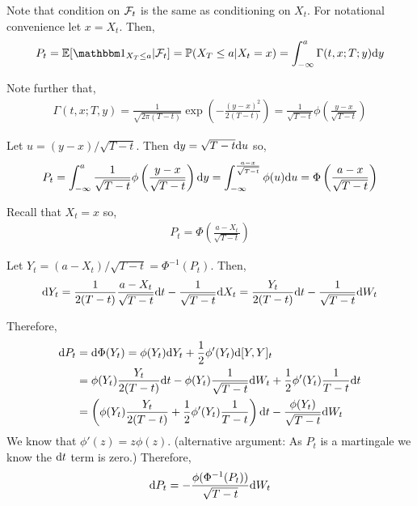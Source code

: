 \begin{solution}[Solution]
Note that condition on \( \mathcal{F}_t \) is the same as conditioning on \( X_t \). For notational convenience let \( x=X_t \). Then,
\begin{align*}
    P_t = \EE[\bOne_{X_T\leq a} | \cF_t] = \PP(X_T\leq a | X_t = x)
    = \int_{-\infty}^a \Gamma(t,x;T;y)\d y
\end{align*}

Note further that,
\begin{align*}
    \Gamma(t,x;T,y) = \frac{1}{\sqrt{2\pi (T-t)}}\exp \left( -\frac{(y-x)^2}{2(T-t)} \right) 
    = \frac{1}{\sqrt{T-t}}\phi \left( \frac{y-x}{\sqrt{T-t}} \right)
\end{align*}

    Let \( u = (y-x)/\sqrt{T-t} \). Then \( \mathrm{d} y = \sqrt{T-t} \mathrm{d} u \) so,
    \begin{align*}
       P_t
        = \int_{-\infty}^{a}  \frac{1}{\sqrt{T-t}}\phi \left( \frac{y-x}{\sqrt{T-t}} \right)\mathrm{d} y
        = \int_{-\infty}^{\frac{a-x}{\sqrt{T-t}}} \phi(u)\mathrm{d} u
        = \Phi \left( \frac{a-x}{\sqrt{T-t}} \right)
    \end{align*}
    
Recall that \( X_t = x \) so,
\begin{align*}
    P_t = \Phi \left( \frac{a-X_t}{\sqrt{T-t}} \right)
   \end{align*}


    Let \( Y_t = (a-X_t)/\sqrt{T-t} = \Phi^{-1}(P_t) \). Then,
    \begin{align*}
        \mathrm{d} Y_t = \frac{1}{2(T-t)} \frac{a-X_t}{\sqrt{T-t}}\mathrm{d} t-\frac{1}{\sqrt{T-t}}\mathrm{d} X_t 
        = \frac{Y_t}{2(T-t)} \mathrm{d} t - \frac{1}{\sqrt{T-t}}\mathrm{d} W_t
    \end{align*}
    
    Therefore,
    \begin{align*}
        \mathrm{d} P_t &= \mathrm{d} \Phi(Y_t) = \phi(Y_t)\mathrm{d} Y_t + \frac{1}{2} \phi'(Y_t)\mathrm{d}[Y,Y]_t 
        \\&= \phi(Y_t) \frac{Y_t}{2(T-t)}\mathrm{d} t - \phi(Y_t) \frac{1}{\sqrt{T-t}}\mathrm{d} W_t + \frac{1}{2}\phi'(Y_t) \frac{1}{T-t}\mathrm{d} t
        \\&= \left(\phi(Y_t) \frac{Y_t}{2(T-t)} + \frac{1}{2}\phi'(Y_t) \frac{1}{T-t} \right)\mathrm{d} t  - \frac{\phi(Y_t)}{\sqrt{T-t}}\mathrm{d} W_t 
    \end{align*}
    We know that \( \phi'(z) = z\phi(z) \).
    (alternative argument: As \( P_t \) is a martingale we know the \( \mathrm{d} t \) term is zero.) 
    Therefore,
    \begin{align*}
        \mathrm{d} P_t = -\frac{\phi(\Phi^{-1}(P_t))}{\sqrt{T-t}}\mathrm{d} W_t
    \end{align*}
    


\end{solution}



